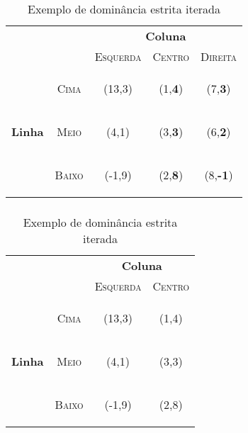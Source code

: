 \begin{frame}
\frametitle{\subsubsecname}
\begin{table}[ht]
\centering
\begin{tabular}{|c|c|c|c|c|}
\cline{3-5}
\multicolumn{1}{c}{} &  & \multicolumn{3}{c|}{\textbf{Coluna}}\tabularnewline
\cline{3-5}
\multicolumn{1}{c}{} &  & \textsc{Esquerda} & \textsc{Centro} & \textsc{Direita}\tabularnewline
\hline
\multirow{3}{*}{\begin{turn}{90}
\textbf{Linha}
\end{turn}} & \begin{turn}{90}
\textsc{Cima}
\end{turn} & {\Large(13,3)} & {\Large(1,\textbf{4})} & {\Large(7,\textbf{3})} \tabularnewline
\cline{2-5}
 & \begin{turn}{90}
\textsc{Meio}
\end{turn} & {\Large(4,1)} & {\Large(3,\textbf{3})} & {\Large(6,\textbf{2})} \tabularnewline
\cline{2-5}
 & \begin{turn}{90}
\textsc{Baixo}
\end{turn} &  {\Large(-1,9)} & {\Large(2,\textbf{8})} & {\Large(8,\textbf{-1})} \tabularnewline
\hline
\end{tabular}
\caption{Exemplo de dominância estrita iterada}
\label{tab:dominancia-estrita-iterada}
\end{table}
\end{frame}

\begin{frame}
\frametitle{\subsubsecname}
\begin{table}[ht]
\centering
\begin{tabular}{|c|c|c|c|}
\cline{3-4}
\multicolumn{1}{c}{} &  & \multicolumn{2}{c|}{\textbf{Coluna}}\tabularnewline
\cline{3-4}
\multicolumn{1}{c}{} &  & \textsc{Esquerda} & \textsc{Centro}\tabularnewline
\hline
\multirow{3}{*}{\begin{turn}{90}
\textbf{Linha}
\end{turn}} & \begin{turn}{90}
\textsc{Cima}
\end{turn} & {\Large(13,3)} & {\Large(1,4)} \tabularnewline
\cline{2-4}
 & \begin{turn}{90}
\textsc{Meio}
\end{turn} & {\Large(4,1)} & {\Large(3,3)} \tabularnewline
\cline{2-4}
 & \begin{turn}{90}
\textsc{Baixo}
\end{turn} &  {\Large(-1,9)} & {\Large(2,8)} \tabularnewline
\hline
\end{tabular}
\caption{Exemplo de dominância estrita iterada}
\label{tab:dominancia-estrita-iterada}
\end{table}
\end{frame}

